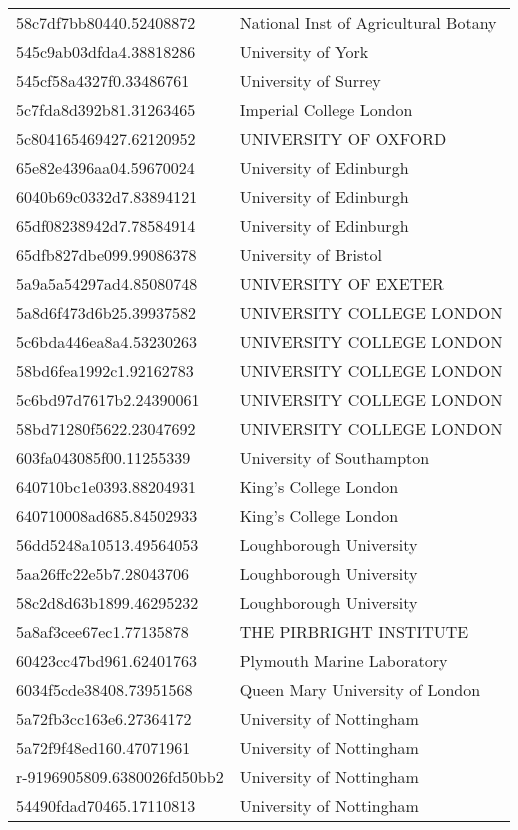 \begin{tabular}{ll}
58c7df7bb80440.52408872 & National Inst of Agricultural Botany \\
545c9ab03dfda4.38818286 & University of York \\
545cf58a4327f0.33486761 & University of Surrey \\
5c7fda8d392b81.31263465 & Imperial College London \\
5c804165469427.62120952 & UNIVERSITY OF OXFORD \\
65e82e4396aa04.59670024 & University of Edinburgh \\
6040b69c0332d7.83894121 & University of Edinburgh \\
65df08238942d7.78584914 & University of Edinburgh \\
65dfb827dbe099.99086378 & University of Bristol \\
5a9a5a54297ad4.85080748 & UNIVERSITY OF EXETER \\
5a8d6f473d6b25.39937582 & UNIVERSITY COLLEGE LONDON \\
5c6bda446ea8a4.53230263 & UNIVERSITY COLLEGE LONDON \\
58bd6fea1992c1.92162783 & UNIVERSITY COLLEGE LONDON \\
5c6bd97d7617b2.24390061 & UNIVERSITY COLLEGE LONDON \\
58bd71280f5622.23047692 & UNIVERSITY COLLEGE LONDON \\
603fa043085f00.11255339 & University of Southampton \\
640710bc1e0393.88204931 & King's College London \\
640710008ad685.84502933 & King's College London \\
56dd5248a10513.49564053 & Loughborough University \\
5aa26ffc22e5b7.28043706 & Loughborough University \\
58c2d8d63b1899.46295232 & Loughborough University \\
5a8af3cee67ec1.77135878 & THE PIRBRIGHT INSTITUTE \\
60423cc47bd961.62401763 & Plymouth Marine Laboratory \\
6034f5cde38408.73951568 & Queen Mary University of London \\
5a72fb3cc163e6.27364172 & University of Nottingham \\
5a72f9f48ed160.47071961 & University of Nottingham \\
r-9196905809.6380026fd50bb2 & University of Nottingham \\
54490fdad70465.17110813 & University of Nottingham \\

\end{tabular}

